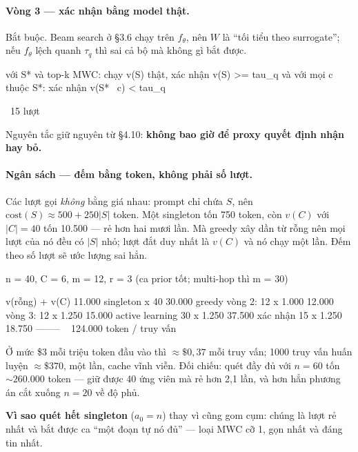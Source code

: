 \documentclass[11pt,a4paper]{article}
\begin{document}
\paragraph{Vòng 3 --- xác nhận bằng model thật.} Bắt buộc. Beam search ở \S3.6 chạy trên
$f_\theta$, nên $W$ là ``tối tiểu theo surrogate''; nếu $f_\theta$ lệch quanh $\tau_q$ thì
sai cả bộ mà không gì bắt được.

\begin{dia}
với S* và top-k MWC:  chạy v(S) thật, xác nhận v(S) >= tau_q
                      và với mọi c thuộc S*:  xác nhận v(S* \ {c}) < tau_q

~15 lượt
\end{dia}

Nguyên tắc giữ nguyên từ \S4.10: \textbf{không bao giờ để proxy quyết định nhận hay bỏ.}

\paragraph{Ngân sách --- đếm bằng token, không phải số lượt.} Các lượt gọi \emph{không}
bằng giá nhau: prompt chỉ chứa $S$, nên $\mathrm{cost}(S)\approx 500+250|S|$ token. Một
singleton tốn 750 token, còn $v(C)$ với $|C|=40$ tốn 10.500 --- rẻ hơn hai mươi lần. Mà
greedy xây dần từ rỗng nên mọi lượt của nó đều có $|S|$ nhỏ; lượt đắt duy nhất là $v(C)$ và
nó chạy một lần. Đếm theo số lượt sẽ ước lượng sai hẳn.

\begin{dia}
n = 40,  C = 6,  m = 12,  r = 3     (ca prior tốt; multi-hop thì m = 30)

v(rỗng) + v(C)                           11.000
singleton x 40                           30.000
greedy   vòng 2:  12 x 1.000             12.000
         vòng 3:  12 x 1.250             15.000
active learning   30 x 1.250             37.500
xác nhận          15 x 1.250             18.750
                                        --------
                                       ~ 124.000 token / truy vấn
\end{dia}

Ở mức \$3 mỗi triệu token đầu vào thì ${\approx}\$0{,}37$ mỗi truy vấn; 1000 truy vấn huấn
luyện ${\approx}\$370$, một lần, cache vĩnh viễn. Đối chiếu: quét đầy đủ với $n=60$ tốn
${\sim}260.000$ token --- giữ được 40 ứng viên mà rẻ hơn 2,1 lần, và hơn hẳn phương án cắt
xuống $n=20$ về độ phủ.

\textbf{Vì sao quét hết singleton} ($a_0=n$) thay vì cũng gom cụm: chúng là lượt rẻ nhất và
bắt được ca ``một đoạn tự nó đủ'' --- loại MWC cỡ 1, gọn nhất và đáng tin nhất.
\end{document}
